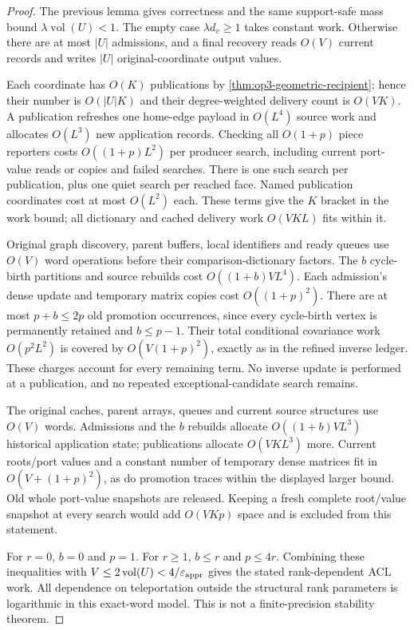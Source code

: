 \begin{proof}
The previous lemma gives correctness and the same support-safe mass bound
$\lambda\operatorname{vol}(U)<1$. The empty case
$\lambda d_v\geq1$ takes constant work. Otherwise there are at most $|U|$
admissions, and a final recovery reads $O(V)$ current records and writes
$|U|$ original-coordinate output values.

Each coordinate has $O(K)$ publications by
\cref{thm:op3-geometric-recipient}; hence their number is $O(|U|K)$ and
their degree-weighted delivery count is $O(VK)$. A publication refreshes
one home-edge payload in $O(L^4)$ source work and allocates $O(L^3)$ new
application records. Checking all $O(1+p)$ piece reporters costs
$O((1+p)L^2)$ per producer search, including current port-value reads or
copies and failed searches. There is one such search per publication,
plus one quiet search per reached face. Named publication coordinates
cost at most $O(L^2)$ each. These terms give the $K$ bracket in the work
bound; all dictionary and cached delivery work $O(VKL)$ fits within it.

Original graph discovery, parent buffers, local identifiers and ready
queues use $O(V)$ word operations before their comparison-dictionary
factors. The $b$ cycle-birth partitions and source rebuilds cost
$O((1+b)VL^4)$. Each admission's dense update and temporary matrix copies
cost $O((1+p)^2)$. There are at most $p+b\leq2p$ old promotion occurrences,
since every cycle-birth vertex is permanently retained and $b\leq p-1$.
Their total conditional covariance work $O(p^2L^2)$ is covered by
$O(V(1+p)^2)$, exactly as in the refined inverse ledger. These charges
account for every remaining term. No inverse update is performed at a
publication, and no repeated exceptional-candidate search remains.

The original caches, parent arrays, queues and current source structures
use $O(V)$ words. Admissions and the $b$ rebuilds allocate
$O((1+b)VL^3)$ historical application state; publications allocate
$O(VKL^3)$ more. Current roots/port values and a constant number of
temporary dense matrices fit in $O(V+(1+p)^2)$, as do promotion traces
within the displayed larger bound. Old whole port-value snapshots are
released. Keeping a fresh complete root/value snapshot at every search
would add $O(VKp)$ space and is excluded from this statement.

For $r=0$, $b=0$ and $p=1$. For $r\geq1$, $b\leq r$ and $p\leq4r$.
Combining these inequalities with $V\leq2\operatorname{vol}(U)<4/\varepsilon_{\mathrm{appr}}$
gives the stated rank-dependent ACL work. All dependence on teleportation
outside the structural rank parameters is logarithmic in this exact-word
model. This is not a finite-precision stability theorem.
\end{proof}

